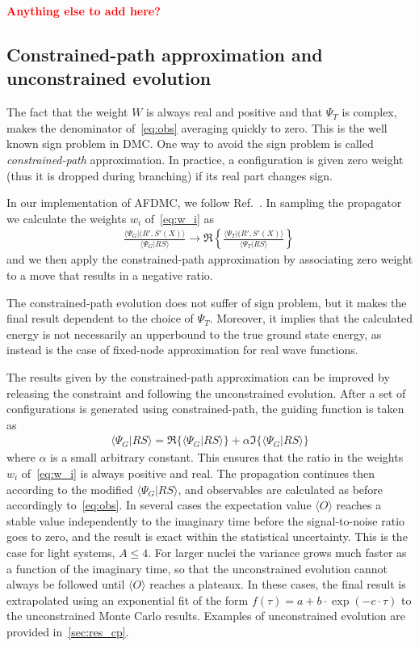 \documentclass[aps,prc,twocolumn,superscriptaddress,floatfix]{revtex4-1}
\newcommand{\red}[1]{\protect\textcolor{red}{#1}}
\begin{document}
\red{\bf Anything else to add here?}



\subsection{Constrained-path approximation and unconstrained evolution}
\label{sec:cp}
The fact that the weight $W$ is always real and positive and that $\Psi_T$ is complex, 
makes the denominator of~\cref{eq:obs} averaging quickly to zero. 
This is the well known sign problem in DMC.
One way to avoid the sign problem is called \emph{constrained-path} approximation. In practice,
a configuration is given zero weight (thus it is dropped during branching) 
if its real part changes sign.

In our implementation of AFDMC, we follow Ref.~\cite{Zhang:2003}. 
In sampling the propagator we calculate the weights $w_i$ of~\cref{eq:w_i} as
\begin{align}
\frac{\langle\Psi_G|(R',S'(X)\rangle}{\langle\Psi_G|RS\rangle}\rightarrow
\Re\left\{\frac{\langle\Psi_T|(R',S'(X)\rangle}{\langle\Psi_T|RS\rangle}\right\}\,
\end{align}
and we then apply the constrained-path approximation by associating zero weight to a move
that results in a negative ratio.

The constrained-path evolution does not suffer of sign problem, but it makes the final result
dependent to the choice of $\Psi_T$. Moreover, it implies that the calculated energy is not necessarily
an upperbound to the true ground state energy, as instead is the case of fixed-node approximation 
for real wave functions.

The results given by the constrained-path approximation can be improved by releasing the 
constraint and following the unconstrained evolution.
After a set of configurations is generated using constrained-path, the guiding function
is taken as
\begin{align}
\langle\Psi_G|RS\rangle=\Re\big\{\langle\Psi_G|RS\rangle\big\}+\alpha\Im\big\{\langle\Psi_G|RS\rangle\big\}
\end{align}
where $\alpha$ is a small arbitrary constant.
This ensures that the ratio in the weights $w_i$ of~\cref{eq:w_i} is always positive and real.
The propagation continues then according to the modified $\langle\Psi_G|RS\rangle$, and 
observables are calculated as before accordingly to~\cref{eq:obs}.
In several cases the expectation value $\langle O\rangle$ reaches a stable value independently
to the imaginary time before the signal-to-noise ratio goes to zero, and the result is exact 
within the statistical uncertainty.
This is the case for light systems, $A\le4$. For larger nuclei the variance grows much faster 
as a function of the imaginary time, so that the unconstrained evolution cannot always be 
followed until $\langle O\rangle$ reaches a plateaux. In these cases, the final result is
extrapolated using an exponential fit of the form $f(\tau)=a+b\cdot\exp(-c\cdot\tau)$ to the unconstrained
Monte Carlo results. Examples of unconstrained evolution are provided in~\cref{sec:res_cp}.
\end{document}
